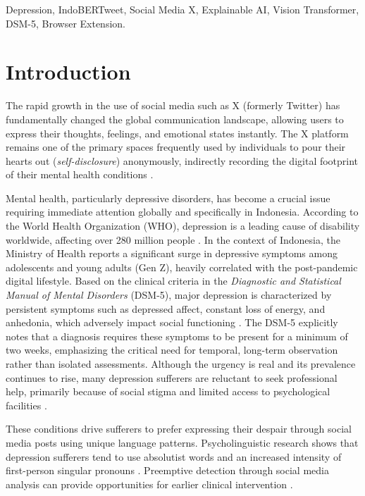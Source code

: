 \documentclass[conference]{IEEEtran}
\begin{document}
\renewcommand\IEEEkeywordsname{Keywords}
\begin{IEEEkeywords}
Depression, IndoBERTweet, Social Media X, Explainable AI,
Vision Transformer, DSM-5, Browser Extension.
\end{IEEEkeywords}

\section{Introduction}

The rapid growth in the use of social media such as X (formerly
Twitter) has fundamentally changed the global communication landscape,
allowing users to express their thoughts, feelings, and emotional
states instantly. The X platform remains one of the primary spaces
frequently used by individuals to pour their hearts out
(\emph{self-disclosure}) anonymously, indirectly recording the digital
footprint of their mental health conditions \cite{b_dhinora}.

Mental health, particularly depressive disorders, has become a crucial
issue requiring immediate attention globally and specifically in Indonesia. According to the World Health Organization (WHO), depression is a leading cause of disability worldwide, affecting over 280 million people \cite{b_who}. In the context of Indonesia, the Ministry of Health reports a significant surge in depressive symptoms among adolescents and young adults (Gen Z), heavily correlated with the post-pandemic digital lifestyle. Based on the clinical
criteria in the \emph{Diagnostic and Statistical Manual of Mental
Disorders} (DSM-5), major depression is characterized by persistent
symptoms such as depressed affect, constant loss of energy, and
anhedonia, which adversely impact social functioning \cite{b_apa}. The DSM-5 explicitly notes that a diagnosis requires these symptoms to be present for a minimum of two weeks, emphasizing the critical need for temporal, long-term observation rather than isolated assessments.
Although the urgency is real and its prevalence continues to rise,
many depression sufferers are reluctant to seek professional help,
primarily because of social stigma and limited access to psychological facilities \cite{b_anastasia}.

These conditions drive sufferers to prefer expressing their despair
through social media posts using unique language patterns.
Psycholinguistic research shows that depression sufferers tend to use
absolutist words \cite{b_almosaiwi} and an increased intensity of
first-person singular pronouns \cite{b_eichstaedt}. Preemptive
detection through social media analysis can provide opportunities for
earlier clinical intervention \cite{b_owen}.
\end{document}
